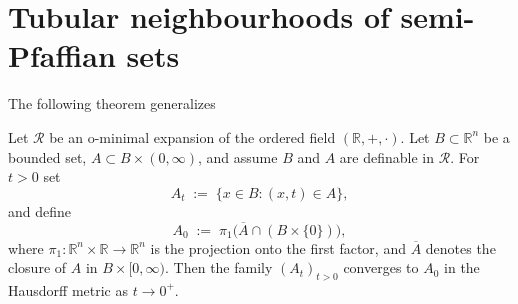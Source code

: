 \section{Tubular neighbourhoods of semi-Pfaffian sets}

The following theorem generalizes~\cite[Proposition 2.5]{}

\begin{theorem}\label{thm:hausdorff-limit-ominimal}
    Let $\mathcal{R}$ be an o\mbox{-}minimal expansion of the ordered field 
    $(\mathbb{R},+,\cdot)$. Let $B \subset \mathbb{R}^n$ be a bounded set,
    $A \subset B \times (0,\infty)$, and assume $B$ and $A$ are definable in $\mathcal{R}$. For $t>0$ set
    \begin{equation*}
    A_t \;:=\; \{ x \in B : (x,t) \in A \},
    \end{equation*}
    and define
    \begin{equation*}
    A_0 \;:=\; \pi_1\bigl( \overline{A} \cap (B \times \{0\}) \bigr),
    \end{equation*}
    where $\pi_1 : \mathbb{R}^n \times \mathbb{R} \to \mathbb{R}^n$ is the projection 
    onto the first factor, and $\overline{A}$ denotes the closure of $A$ in 
    $B \times [0,\infty)$.
    Then the family $(A_t)_{t>0}$ converges to $A_0$ in the Hausdorff metric as 
    $t \to 0^+$. 
\end{theorem}

